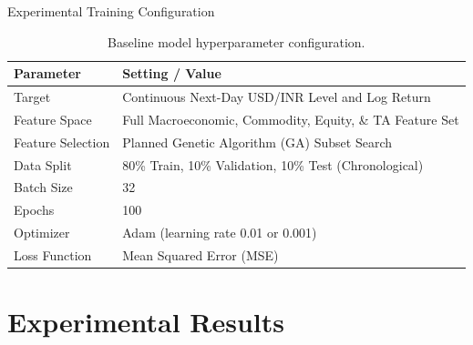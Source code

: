 \documentclass[aspectratio=169]{beamer}
\begin{document}
\begin{frame}{Experimental Training Configuration}
	\begin{table}
		\centering
		\caption{Baseline model hyperparameter configuration.}
		\label{tab:hyperparameters}
		\begin{tabular}{ll}
			\toprule
			\textbf{Parameter} & \textbf{Setting / Value} \\
			\midrule
			Target & Continuous Next-Day USD/INR Level and Log Return \\
			Feature Space & Full Macroeconomic, Commodity, Equity, \& TA Feature Set \\
			Feature Selection & Planned Genetic Algorithm (GA) Subset Search \\
			Data Split & 80\% Train, 10\% Validation, 10\% Test (Chronological) \\
			Batch Size & 32 \\
			Epochs & 100 \\
			Optimizer & Adam (learning rate 0.01 or 0.001) \\
			Loss Function & Mean Squared Error (MSE) \\
			\bottomrule
		\end{tabular}
	\end{table}
\end{frame}

\section{Experimental Results}
\subsection*{}
\end{document}
